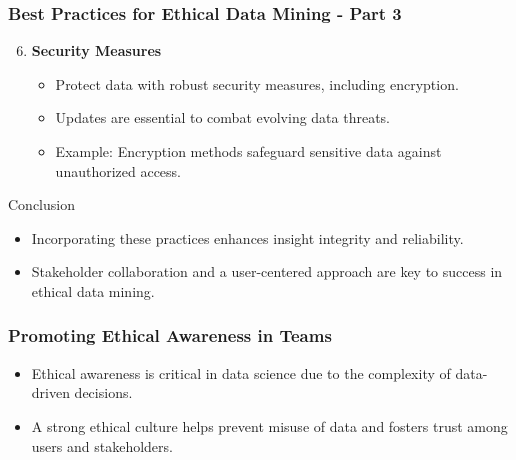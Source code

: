 \documentclass[aspectratio=169]{beamer}
\begin{document}
\begin{frame}[fragile]
    \frametitle{Best Practices for Ethical Data Mining - Part 3}
    \begin{enumerate}
        \setcounter{enumi}{5}
        \item \textbf{Security Measures}
            \begin{itemize}
                \item Protect data with robust security measures, including encryption.
                \item Updates are essential to combat evolving data threats.
                \item Example: Encryption methods safeguard sensitive data against unauthorized access.
            \end{itemize}
    \end{enumerate}
    \begin{block}{Conclusion}
        \begin{itemize}
            \item Incorporating these practices enhances insight integrity and reliability.
            \item Stakeholder collaboration and a user-centered approach are key to success in ethical data mining.
        \end{itemize}
    \end{block}
\end{frame}

\begin{frame}[fragile]
    \frametitle{Promoting Ethical Awareness in Teams}
    \begin{itemize}
        \item Ethical awareness is critical in data science due to the complexity of data-driven decisions.
        \item A strong ethical culture helps prevent misuse of data and fosters trust among users and stakeholders.
    \end{itemize}
\end{frame}
\end{document}

